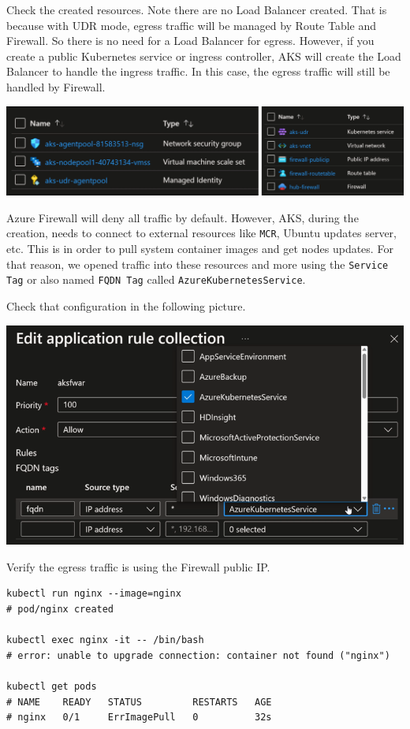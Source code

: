 \documentclass[
]{article}
\newcommand{\passthrough}[1]{#1}
\begin{document}
Check the created resources. Note there are no Load Balancer created.
That is because with UDR mode, egress traffic will be managed by Route
Table and Firewall. So there is no need for a Load Balancer for egress.
However, if you create a public Kubernetes service or ingress
controller, AKS will create the Load Balancer to handle the ingress
traffic. In this case, the egress traffic will still be handled by
Firewall.

\includegraphics{images/65_aks_egress_lb_natgw_udr__udr-resources.png}

Azure Firewall will deny all traffic by default. However, AKS, during
the creation, needs to connect to external resources like
\passthrough{\lstinline!MCR!}, Ubuntu updates server, etc. This is in
order to pull system container images and get nodes updates. For that
reason, we opened traffic into these resources and more using the
\passthrough{\lstinline!Service Tag!} or also named
\passthrough{\lstinline!FQDN Tag!} called
\passthrough{\lstinline!AzureKubernetesService!}.

Check that configuration in the following picture.

\includegraphics{images/65_aks_egress_lb_natgw_udr__udr-fqdn-aks.png}

Verify the egress traffic is using the Firewall public IP.

\begin{lstlisting}
kubectl run nginx --image=nginx
# pod/nginx created

kubectl exec nginx -it -- /bin/bash
# error: unable to upgrade connection: container not found ("nginx")

kubectl get pods
# NAME    READY   STATUS         RESTARTS   AGE
# nginx   0/1     ErrImagePull   0          32s
\end{lstlisting}
\end{document}

